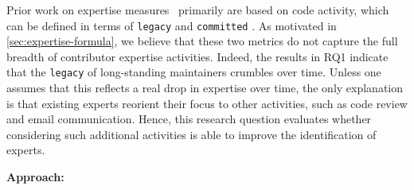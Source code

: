 Prior work on expertise measures~\citep{Anvik-2006, Bhattacharya, McDonald, Minto-2007, mockus02} primarily are based on code activity, which can be defined in terms of \texttt{legacy} and \texttt{committed}%
. As motivated in \autoref{sec:expertise-formula}, we believe that these two metrics do not capture the full breadth of contributor expertise activities. Indeed, the results in RQ1 indicate that the \texttt{legacy} of long-standing maintainers crumbles over time. Unless one assumes that this reflects a real drop in expertise over time, the only explanation is that existing experts reorient their focus to other activities, such as code review and email communication. Hence, this research question evaluates whether considering such additional activities is able to improve the identification of experts.%

{\bf Approach:}





